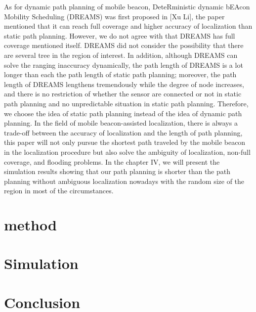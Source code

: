 \documentclass[conference]{IEEEtran}
\begin{document}
	As for dynamic path planning of mobile beacon, DeteRministic dynamic bEAcon Mobility Scheduling (DREAMS) was first proposed in [Xu Li], the paper mentioned that it can reach full coverage and higher accuracy of localization than static path planning. However, we do not agree with that DREAMS has full coverage mentioned itself. DREAMS did not consider the possibility that there are several tree in the region of interest. In addition, although DREAMS can solve the ranging inaccuracy dynamically, the path length of DREAMS is a lot longer than each the path length of static path planning; moreover, the path length of DREAMS lengthens tremendously while the degree of node increases, and there is no restriction of whether the sensor are connected or not in static path planning and no unpredictable situation in static path planning. Therefore, we choose the idea of static path planning instead of the idea of dynamic path planning.
	In the field of mobile beacon-assisted localization, there is always a trade-off between the accuracy of localization and the length of path planning, this paper will not only pursue the shortest path traveled by the mobile beacon in the localization procedure but also solve the ambiguity of localization, non-full coverage, and flooding problems. In the chapter IV, we will present the simulation results showing that our path planning is shorter than the path planning without ambiguous localization nowadays with the random size of the region in most of the circumstances. 


\section{method}
\blindtext

\section{Simulation}
\blindtext

\section{Conclusion}
\blindtext


\end{document}
